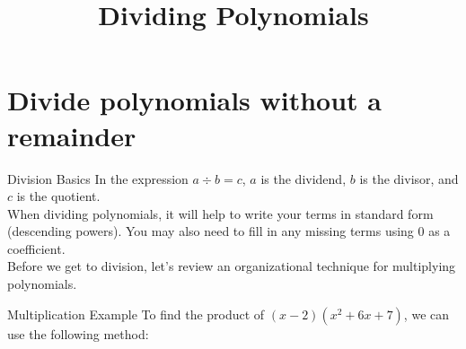 \documentclass[t,usenames,dvipsnames]{beamer}
\title{Dividing Polynomials}
\author{}
\date{}
\begin{document}
\begin{frame}
    \maketitle
\end{frame}

\section{Divide polynomials without a remainder}

\begin{frame}{Division Basics}
In the expression $a \div b = c$, $a$ is the \alert{dividend}, $b$ is the \alert{divisor}, and $c$ is the \alert{quotient}.   \newline\\

When dividing polynomials, it will help to write your terms in standard form (descending powers). You may also need to fill in any missing terms using 0 as a coefficient. \newline\\

Before we get to division, let's review an organizational technique for multiplying polynomials.
\end{frame}

\begin{frame}{Multiplication Example}
To find the product of $(x-2)(x^2+6x+7)$, we can use the following method:   
\begin{center}
\end{center}
\end{frame}
\end{document}
